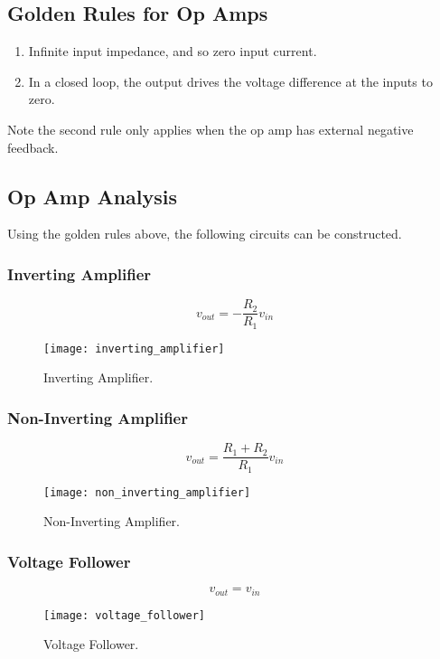 \documentclass{article}
\begin{document}
\subsection{Golden Rules for Op Amps}
\begin{enumerate}
    \item Infinite input impedance, and so zero input current.
    \item In a closed loop, the output drives the voltage difference at the inputs to zero.
\end{enumerate}
Note the second rule only applies when the op amp has external negative feedback.
\subsection{Op Amp Analysis}
Using the golden rules above, the following circuits can be constructed.
\subsubsection{Inverting Amplifier}
\begin{equation*}
    v_{out} = -\frac{R_2}{R_1}v_{in}
\end{equation*}
\begin{figure}[H]
    \centering
    \texttt{[image: inverting\_amplifier]}
    \caption{Inverting Amplifier.}
\end{figure}
\subsubsection{Non-Inverting Amplifier}
\begin{equation*}
    v_{out} = \frac{R_1 + R_2}{R_1}v_{in}
\end{equation*}
\begin{figure}[H]
    \centering
    \texttt{[image: non\_inverting\_amplifier]}
    \caption{Non-Inverting Amplifier.}
\end{figure}
\subsubsection{Voltage Follower}
\begin{equation*}
    v_{out} = v_{in}
\end{equation*}
\begin{figure}[H]
    \centering
    \texttt{[image: voltage\_follower]}
    \caption{Voltage Follower.}
\end{figure}
\end{document}
